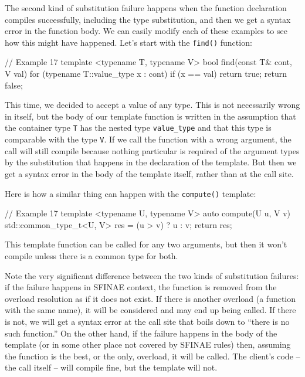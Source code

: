 The second kind of substitution failure happens when the function declaration compiles successfully, including the type substitution, and then we get a syntax error in the function body. We can easily modify each of these examples to see how this might have happened. Let's start with the \texttt{find()} function:

\begin{code}
// Example 17
template <typename T, typename V>
bool find(const T& cont, V val) {
  for (typename T::value_type x : cont) {
    if (x == val) return true;
  }
  return false;
}
\end{code}

This time, we decided to accept a value of any type. This is not necessarily wrong in itself, but the body of our template function is written in the assumption that the container type \texttt{T} has the nested type \texttt{value\_type} and that this type is comparable with the type \texttt{V}. If we call the function with a wrong argument, the call will still compile because nothing particular is required of the argument types by the substitution that happens in the declaration of the template. But then we get a syntax error in the body of the template itself, rather than at the call site.

Here is how a similar thing can happen with the \texttt{compute()} template:

\begin{code}
// Example 17
template <typename U, typename V>
auto compute(U u, V v) {
  std::common_type_t<U, V> res = (u > v) ? u : v;
  return res;
}
\end{code}

This template function can be called for any two arguments, but then it won't compile unless there is a common type for both.

Note the very significant difference between the two kinds of substitution failures: if the failure happens in SFINAE context, the function is removed from the overload resolution as if it does not exist. If there is another overload (a function with the same name), it will be considered and may end up being called. If there is not, we will get a syntax error at the call site that boils down to ``there is no such function.'' On the other hand, if the failure happens in the body of the template (or in some other place not covered by SFINAE rules) then, assuming the function is the best, or the only, overload, it will be called. The client's code -- the call itself -- will compile fine, but the template will not.

